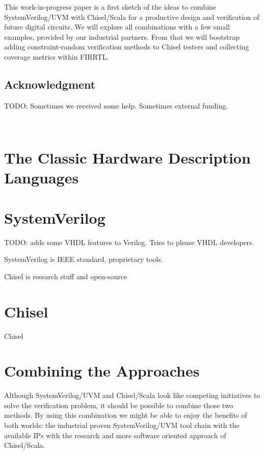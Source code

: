 \documentclass[a4paper, conference]{IEEEtran}
\newcommand{\todo}[1]{{\color{olive} TODO: #1}}
\begin{document}
This work-in-progress paper is a first sketch of the ideas to combine SystemVerilog/UVM
with Chisel/Scala for a productive design and verification of future digital circuits.
We will explore all combinations with a few small examples, provided by our industrial
partners.
From that we will bootstrap adding constraint-random verification methods to Chisel
testers and collecting coverage metrics within FIRRTL.

\subsection*{Acknowledgment}

\todo{Sometimes we received some help. Sometimes external funding.}


~
\newpage
~
\newpage

\section{The Classic Hardware Description Languages}

\section{SystemVerilog}

\todo{adds some VHDL features to Verilog. Tries to please VHDL developers.}

SystemVerilog is IEEE standard, proprietary tools.

Chisel is research stuff and open-source

\section{Chisel}

Chisel~\cite{chisel:dac2012} 

\section{Combining the Approaches}

Although SystemVerilog/UVM and Chisel/Scala look like competing initiatives
to solve the verification problem, it should be possible to combine those two methods.
By using this combination we might be able to enjoy the benefits of both worlds:
the industrial proven SystemVerilog/UVM tool chain with the available IPs with
the research and more software oriented approach of Chisel/Scala. 
\end{document}
